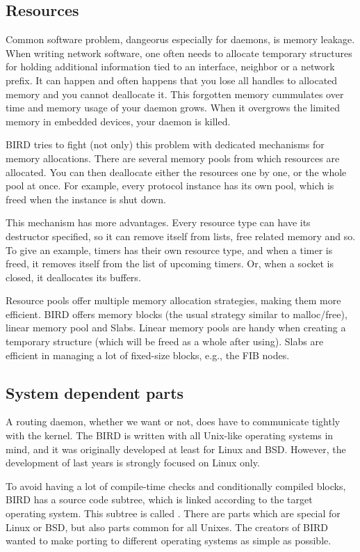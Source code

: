 \subsection{Resources}
Common software problem, dangeorus especially for daemons, is memory leakage.
When writing network software, one often needs to allocate temporary structures
for holding additional information tied to an interface, neighbor or a network
prefix. It can happen and often happens that you lose all handles to allocated
memory and you cannot deallocate it. This forgotten memory cummulates over time
and memory usage of your daemon grows. When it overgrows the limited memory
in embedded devices, your daemon is killed.

BIRD tries to fight (not only) this problem with dedicated mechanisms for
memory allocations. There are several memory pools from which resources are
allocated. You can then deallocate either the resources one by one, or the
whole pool at once. For example, every protocol instance has its own pool,
which is freed when the instance is shut down.

This mechanism has more advantages. Every resource type can have its destructor
specified, so it can remove itself from lists, free related memory and so. To
give an example, timers has their own resource type, and when a timer is freed,
it removes itself from the list of upcoming timers. Or, when a socket is
closed, it deallocates its buffers.

Resource pools offer multiple memory allocation strategies, making them more
efficient. BIRD offers memory blocks (the usual strategy similar to
malloc/free), linear memory pool and Slabs. Linear memory pools are handy when
creating a temporary structure (which will be freed as a whole after using).
Slabs are efficient in managing a lot of fixed-size blocks, e.g., the FIB nodes.

\subsection{System dependent parts}
A routing daemon, whether we want or not, does have to communicate tightly with
the kernel. The BIRD is written with all Unix-like operating systems in mind,
and it was originally developed at least for Linux and BSD. However, the
development of last years is strongly focused on Linux only.

To avoid having a lot of compile-time checks and conditionally compiled blocks,
BIRD has a source code subtree, which is linked according to the target
operating system. This subtree is called . There are parts which
are special for Linux or BSD, but also parts common for all Unixes. The
creators of BIRD wanted to make porting to different operating systems as
simple as possible.

